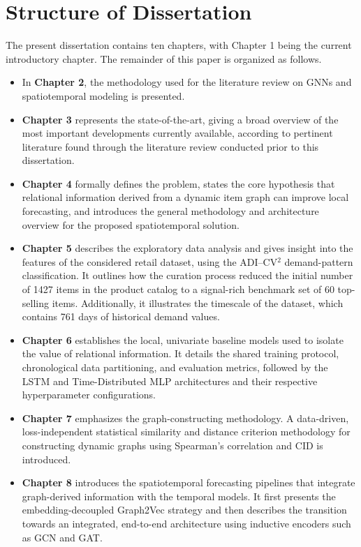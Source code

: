 \section{Structure of Dissertation} \label{sec:structure}
The present dissertation contains ten chapters, with Chapter 1 being the current introductory chapter. The remainder of this paper is organized as follows.

\begin{itemize}
\item In \textbf{Chapter 2}, the methodology used for the literature review on GNNs and spatiotemporal modeling is presented.
\item \textbf{Chapter 3} represents the state-of-the-art, giving a broad overview of the most important developments currently available, according to pertinent literature found through the literature review conducted prior to this dissertation.
\item \textbf{Chapter 4} formally defines the problem, states the core hypothesis that relational information derived from a dynamic item graph can improve local forecasting, and introduces the general methodology and architecture overview for the proposed spatiotemporal solution.
\item \textbf{Chapter 5} describes the exploratory data analysis and gives insight into the features of the considered retail dataset, using the ADI--CV$^2$ demand-pattern classification. It outlines how the curation process reduced the initial number of 1427 items in the product catalog to a signal-rich benchmark set of 60 top-selling items. Additionally, it illustrates the timescale of the dataset, which contains 761 days of historical demand values.
\item \textbf{Chapter 6} establishes the local, univariate baseline models used to isolate the value of relational information. It details the shared training protocol, chronological data partitioning, and evaluation metrics, followed by the LSTM and Time-Distributed MLP architectures and their respective hyperparameter configurations.
\item \textbf{Chapter 7} emphasizes the graph-constructing methodology. A data-driven, loss-independent statistical similarity and distance criterion methodology for constructing dynamic graphs using Spearman's correlation and CID is introduced.
\item \textbf{Chapter 8} introduces the spatiotemporal forecasting pipelines that integrate graph-derived information with the temporal models. It first presents the embedding-decoupled Graph2Vec strategy and then describes the transition towards an integrated, end-to-end architecture using inductive encoders such as GCN and GAT.

\end{itemize}
